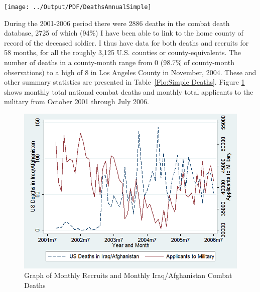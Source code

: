 \documentclass[12pt] {article}
\begin{document}
\begin{table}
\caption{}
\label{Flo:Simple Deaths}\texttt{[image: ../Output/PDF/DeathsAnnualSimple]}
\end{table}


During the 2001-2006 period there were 2886 deaths in the combat death database, 2725 of which (94\%) I have been able to link to the home county of record of the deceased soldier. I thus have data for both deaths and recruits for 58 months, for all the roughly 3,125 U.S. counties or county-equivalents. The number of deaths in a county-month range from 0 (98.7\% of county-month observations) to a high of 8 in Los Angeles County in November, 2004. These and other summary statistics are presented in Table~\ref{Flo:Simple Deaths}. Figure \ref{Flo:Monthly Deaths vs. Monthly Recruits} shows monthly total national combat deaths and monthly total applicants to the military from October 2001 through July 2006. 

\begin{figure}
\includegraphics[scale=0.5]{../Output/graph_deathsvsrecruits_basic}
\caption{Graph of Monthly Recruits and Monthly Iraq/Afghanistan Combat Deaths}
\label{Flo:Monthly Deaths vs. Monthly Recruits}
\end{figure} 
 
 
\end{document}
